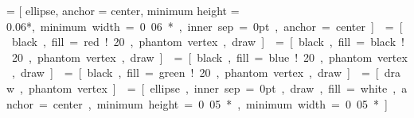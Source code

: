  = [ ellipse, 
                               anchor = center, 
                               minimum height = 0.06*\unit, 
                               minimum width  = 0.06*\unit,
                               inner sep=0pt,
                               anchor=center]
   = [black, fill = red!20,   phantom vertex, draw]
 = [black, fill = black!20, phantom vertex, draw]
  = [black, fill = blue!20,  phantom vertex, draw]
 = [black, fill = green!20,  phantom vertex, draw]
       = [draw, phantom vertex]

 = [ellipse, inner sep=0pt, draw, fill=white, anchor = center,
                     minimum height = 0.05*\unit, minimum width  = 0.05*\unit]